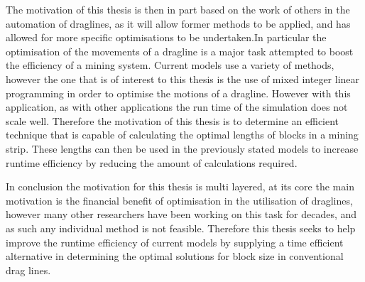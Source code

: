 The motivation of this thesis is then in part based on the work of others in the automation of draglines, as it will allow former methods to be applied, and has allowed for more specific optimisations to be undertaken.In particular the optimisation of the movements of a dragline is a major task attempted to boost the efficiency of a mining system. Current models use a variety of methods, however the one that is of interest to this thesis is the use of mixed integer linear programming\cite{ORPlanning} in order to optimise the motions of a dragline. However with this application, as with other applications the run time of the simulation does not scale well. Therefore the motivation of this thesis is to determine an efficient technique that is capable of calculating the optimal lengths of blocks in a mining strip. These lengths can then be used in the previously stated models to increase runtime efficiency by reducing the amount of calculations required. 

In conclusion the motivation for this thesis is multi layered, at its core the main motivation is the financial benefit of optimisation in the utilisation of draglines, however many other researchers have been working on this task for decades, and as such any individual method is not feasible. Therefore this thesis seeks to help improve the runtime efficiency of current models by supplying a time efficient alternative in determining the optimal solutions for block size in conventional drag lines. 




